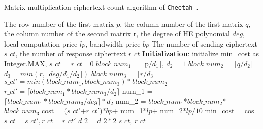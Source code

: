 \begin{algorithm}[ht]
\small
\caption{Matrix multiplication ciphertext count algorithm of \texttt{Cheetah}~\cite{Cheetah}. }
\label{alg:cheetah}
 \begin{algorithmic}[1]
    \REQUIRE The row number of the first matrix $p$, the column number of the first matrix $q$, the column number of the second matrix r, the degree of HE polynomial $\mathit{deg}$, local computation price $\mathit{lp}$, bandwidth price $\mathit{bp}$
    \ENSURE The number of sending ciphertext $\mathit{s\_ct}$, the number of response ciphertext $\mathit{r\_ct}$
    \STATE \textbf{Initialization}: initialize min\_cost as Integer.MAX, $\mathit{s\_ct}$ = $\mathit{r\_ct}$ =0
    \STATE $\mathit{block\_num_1}$ = $\lceil $p$/d_1 \rceil$, $\mathit{d_2 = 1}$
    \STATE $\mathit{block\_num_2}$ = $\lceil q/d_2 \rceil$
    \STATE $\mathit{d_3 = min(r, \lceil deg / d_1 / d_2 \rceil)}$
    \STATE $\mathit{block\_num_3}$ = $\lceil r/d_3 \rceil$
    \STATE $\mathit{s\_ct' = min(block\_num_1, block\_num_3)* block\_num_2}$
    \STATE $\mathit{r\_ct' = \lceil block\_num_1*block\_num_3/ d_2 \rceil}$
    \STATE num\_1 = $\mathit{\lceil block\_num_1 * block\_num_3 / deg \rceil*d_2}$
    \STATE num\_2 = $\mathit{block\_num_1}$*$\mathit{block\_num_2}$*$\mathit{block\_num_3}$
    \STATE cost = $(\mathit{s\_ct'}$+$\mathit{r\_ct'}$)*$\mathit{bp}$+ num\_1*$\mathit{lp}$+ num\_2*$\mathit{lp}/10$
    \STATE min\_cost = cos
    \STATE $\mathit{s\_ct = s\_ct', r\_ct = r\_ct'}$
    \ENDIF
    \STATE $\mathit{d\_2 = d\_2 *2}$
    \ENDWHILE
    \ENDFOR
    \RETURN $\mathit{s\_ct}$, $\mathit{r\_ct}$
\end{algorithmic}
\end{algorithm}

